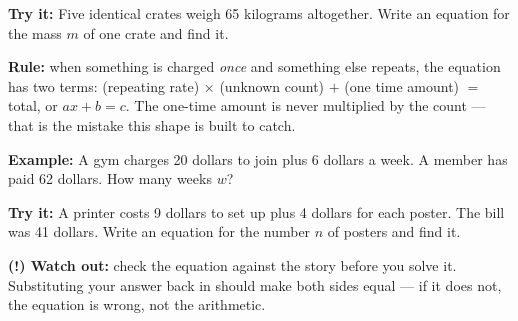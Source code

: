 \documentclass[12pt]{article}
\begin{document}
\begin{tryitbox}
\textbf{Try it:} \quad Five identical crates weigh 65 kilograms altogether.
Write an equation for the mass $m$ of one crate and find it.\\[2pt]
\end{tryitbox}


\begin{formulabox}
\textbf{Rule:} when something is charged \emph{once} and something else repeats,
the equation has two terms: (repeating rate) $\times$ (unknown count) $+$ (one
time amount) $=$ total, or $ax + b = c$. The one-time amount is never multiplied
by the count --- that is the mistake this shape is built to catch.
\end{formulabox}

\begin{examplebox}
\textbf{Example:} \quad A gym charges 20 dollars to join plus 6 dollars a week.
A member has paid 62 dollars. How many weeks $w$?
\end{examplebox}

\begin{tryitbox}
\textbf{Try it:} \quad A printer costs 9 dollars to set up plus 4 dollars for
each poster. The bill was 41 dollars. Write an equation for the number $n$ of
posters and find it.\\[2pt]
\end{tryitbox}

\begin{watchoutbox}
\textbf{(!) Watch out:} check the equation against the story before you solve
it. Substituting your answer back in should make both sides equal --- if it does
not, the equation is wrong, not the arithmetic.
\end{watchoutbox}
\end{document}

